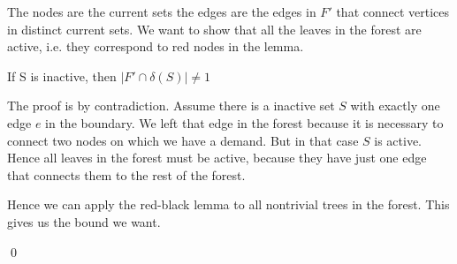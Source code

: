 \begin{pr}
The nodes are the current sets the edges are the edges in $F'$ that connect vertices in distinct current sets. We want to show that all the leaves in the forest are active, i.e. they correspond to red nodes in the lemma.

\begin{lem} If S is inactive, then $|F'\cap \delta(S)|\neq 1$\end{lem}

The proof is by contradiction. Assume there is a inactive set $S$ with exactly one edge $e$ in the boundary. We left that edge in the forest because it is necessary to connect two nodes on which we have a demand. But in that case $S$ is active. Hence all leaves in the forest must be active, because they have just one edge that connects them to the rest of the forest.

Hence we can apply the red-black lemma to all nontrivial trees in the forest. This gives us the bound we want.

\qed
\end{pr}